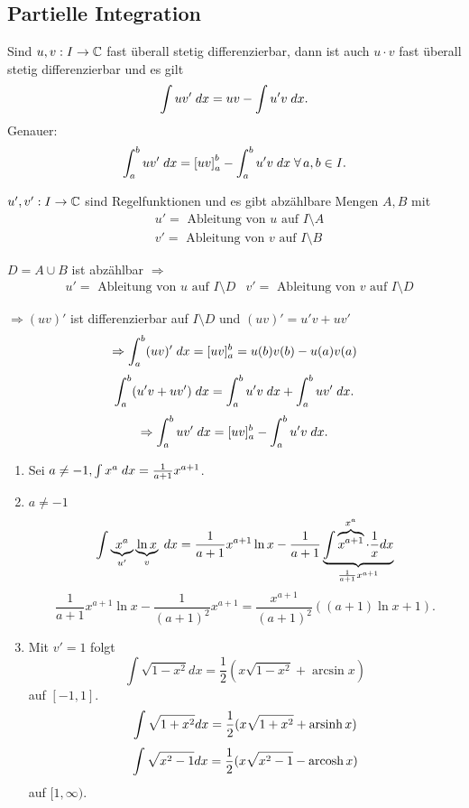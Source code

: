 \documentclass[../ana2.tex]{subfiles}
\begin{document}
\subsection*{Partielle Integration}
\begin{satz}
    Sind \(\abb{u,v}{I}{\C}\) fast überall stetig 
    differenzierbar, dann ist auch 
    \( u \cdot v \) fast überall stetig differenzierbar und 
    es gilt 
    \[ \int u v' \dx = uv - \int u' v \dx. \]
    Genauer: 
    \[ \integral{uv'}{a}{b} 
    = \left[ uv \right]_a^b - \integral{u'v}{a}{b} 
    \;\forall a,b\in I. \]
\end{satz}
\begin{bew}
\( \abb{u',v'}{I}{\C} \) sind Regelfunktionen und es gibt 
abzählbare Mengen \(A,B\) mit 
\begin{align*}
    & u' = \text{ Ableitung von } u \text{ auf } I \setminus A \\
    & v' = \text{ Ableitung von } v \text{ auf } I \setminus B 
\end{align*}

\(D = A \cup B \) ist abzählbar
\(\Rightarrow\)
\begin{align*}
    &u' = \text{ Ableitung von } u \text{ auf } I \setminus D
    &v' = \text{ Ableitung von } v \text{ auf } I \setminus D
\end{align*}

\( \Rightarrow (uv)' \) ist differenzierbar auf 
\( I \setminus D \) und \( (uv)' = u'v + uv' \)
\[ \Rightarrow \integral{(uv)'}{a}{b} 
= [uv]_a^b = u(b)v(b) - u(a)v(a) \]
\[ \integral{(u'v + uv')}{a}{b} 
= \integral{u'v}{a}{b} + \integral{uv'}{a}{b}. \]
\[ \Rightarrow \integral{uv'}{a}{b} 
= [uv]_a^b - \integral{u'v}{a}{b}. \]
\end{bew}
\begin{bspe}
    \begin{enumerate}
        \item Sei \( a \neq -1, 
        \int x^a \dx = \frac{1}{a+1}x^{a+1} \).
        \item \(a \neq -1\)
        \[ \int \underbrace{x^a}_{u'} \underbrace{\ln x}_{v} \dx 
        = \frac{1}{a+1}x^{a+1} \ln x 
        - \frac{1}{a+1} 
        \underbrace{\int \overbrace{x^{a+1}}^{x^a} \cdot \frac{1}{x} dx}_
    {\frac{1}{a+1}x^{a+1}} \]
        \[ \frac{1}{a+1} x^{a+1} \ln x 
        - \frac{1}{(a+1)^2} x^{a+1} 
        = \frac{x^{a+1}}{(a+1)^2} 
        ((a+1) \ln x + 1). \]
        \item Mit \( v' = 1 \) folgt 
        \[ \int \sqrt{1-x^2} dx 
        = \frac{1}{2} (x \sqrt{1 - x^2} + \arcsin x) \]
        auf \( [-1,1] \).\\
        \[ \int \sqrt{1 + x^2} dx 
        = \frac{1}{2} (x \sqrt{1 + x^2} + \arsinh x) \]
        \[ \int \sqrt{x^2 - 1} dx 
        = \frac{1}{2} (x \sqrt{x^2 - 1} - \arcosh x) \]
        auf \( [1,\infty) \).
    \end{enumerate}
\end{bspe}
\end{document}
